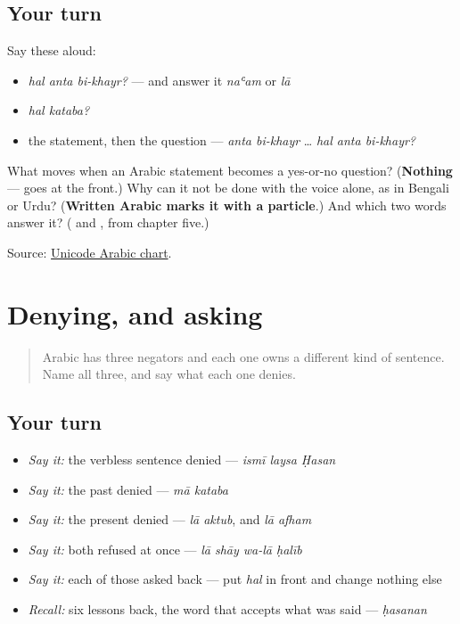 \subsection*{Your turn}
Say these aloud:

\begin{itemize}
\raggedright
  \item \emph{hal anta bi-khayr?} — and answer it \emph{naʿam} or \emph{lā}
  \item \emph{hal kataba?}
  \item the statement, then the question — \emph{anta bi-khayr} … \emph{hal anta bi-khayr?}
\end{itemize}

\begin{tcolorbox}[breakable,colback=teal!4,colframe=teal!35!black,title={Before you move on}]
What moves when an Arabic statement becomes a yes-or-no question? (\textbf{Nothing} — \textbf{} goes at the front.) Why can it not be done with the voice alone, as in Bengali or Urdu? (\textbf{Written Arabic marks it with a particle}.) And which two words answer it? (\textbf{} and \textbf{}, from chapter five.)

Source: \href{https://www.unicode.org/charts/PDF/U0600.pdf}{Unicode Arabic chart}.
\end{tcolorbox}
\section[\texorpdfstring{\ar{ليس} · \ar{ما} · \ar{هل} (laysa · mā · hal)}{ليس · ما · هل (laysa · mā · hal)}]{Denying, and asking}

\label{lesson:AR-R39-denying-and-asking}



\begin{quote}
Arabic has three negators and each one owns a different kind of sentence. Name all three, and say what each one denies.
\end{quote}

\subsection*{Your turn}
\begin{itemize}
\raggedright
  \item \emph{Say it:} the verbless sentence denied — \emph{ismī laysa Ḥasan}
  \item \emph{Say it:} the past denied — \emph{mā kataba}
  \item \emph{Say it:} the present denied — \emph{lā aktub}, and \emph{lā afham}
  \item \emph{Say it:} both refused at once — \emph{lā shāy wa-lā ḥalīb}
  \item \emph{Say it:} each of those asked back — put \emph{hal} in front and change nothing else
  \item \emph{Recall:} six lessons back, the word that accepts what was said — \emph{ḥasanan}
\end{itemize}

